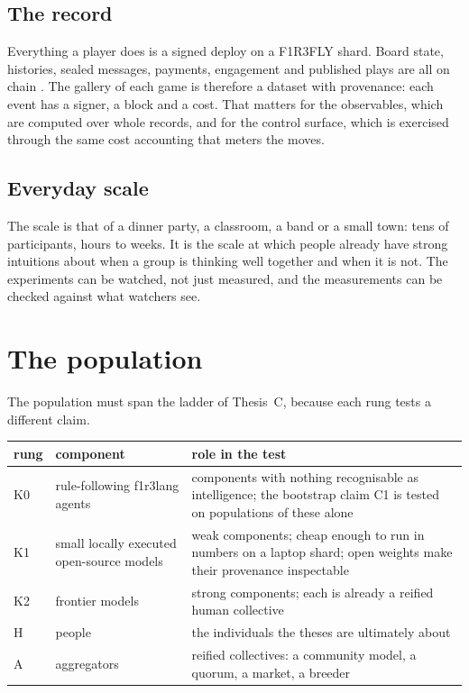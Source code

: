 \documentclass[11pt,a4paper]{article}
\begin{document}
\subsection{The record}

Everything a player does is a signed deploy on a F1R3FLY shard. Board state, histories, sealed
messages, payments, engagement and published plays are all on chain \cite{portal-design}. The
gallery of each game is therefore a dataset with provenance: each event has a signer, a block and a
cost. That matters for the observables, which are computed over whole records, and for the control
surface, which is exercised through the same cost accounting that meters the moves.

\subsection{Everyday scale}

The scale is that of a dinner party, a classroom, a band or a small town: tens of participants,
hours to weeks. It is the scale at which people already have strong intuitions about when a group
is thinking well together and when it is not. The experiments can be watched, not just measured,
and the measurements can be checked against what watchers see.

\section{The population}\label{sec:population}

The population must span the ladder of Thesis~C, because each rung tests a different claim.

\begin{center}\small
\begin{tabularx}{\linewidth}{@{}l>{\raggedright\arraybackslash}p{38mm}X@{}}
\toprule
rung & component & role in the test \\
\midrule
K0 & rule-following f1r3lang agents & components with nothing recognisable as intelligence; the
  bootstrap claim C1 is tested on populations of these alone \\
K1 & small locally executed open-source models & weak components; cheap enough to run in
  numbers on a laptop shard; open weights make their provenance inspectable \\
K2 & frontier models & strong components; each is already a reified human collective \\
H & people & the individuals the theses are ultimately about \\
A & aggregators & reified collectives: a community model, a quorum, a market, a breeder \\
\bottomrule
\end{tabularx}
\end{center}
\end{document}
